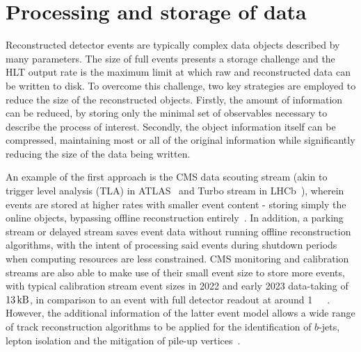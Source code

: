 \section{Processing and storage of data}
\label{sec:data}

Reconstructed detector events are typically complex data objects described by many parameters. 
The size of full events presents a storage challenge and the HLT output rate is the maximum limit at which raw and reconstructed data can be written to disk.
To overcome this challenge, two key strategies are employed to reduce the size of the reconstructed objects. Firstly, the amount of information can be reduced, by storing only the minimal set of observables necessary to describe the process of interest. Secondly, the object information itself can be compressed, maintaining most or all of the original information while significantly reducing the size of the data being written.

An example of the first approach is the CMS data scouting stream (akin to trigger level analysis (TLA) in ATLAS~\cite{ATLAS:TLA} and Turbo stream in LHCb~\cite{Aaij:2019uij}), wherein events are stored at higher rates with smaller event content - storing simply the online objects, bypassing offline reconstruction entirely~\cite{ardino202340cms,tomei2020cms,badaro202040cms}. 
In addition, a parking stream or delayed stream saves event data without running offline reconstruction algorithms, with the intent of processing said events during shutdown periods when computing resources are less constrained. 
CMS monitoring and calibration streams are also able to make use of their small event size to store more events, with typical calibration stream event sizes in 2022 and early 2023 data-taking of $\SI{13}{\kilo\byte}$, in comparison to an event with full detector readout at around \SI{1}{\mega\byte}~\cite{CMS:run3-detector}. However, the additional information of the latter event model allows a wide range of track reconstruction algorithms to be applied for the identification of $b$-jets, lepton isolation and the mitigation of pile-up vertices~\cite{tosi2016trackingcms}. 

